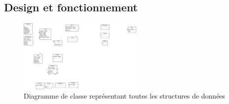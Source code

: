 \documentclass[a4paper]{article}
\begin{document}
\subsection{Design et fonctionnement}
\begin{figure}[h]
   \caption{\label{3} Diagramme de classe représentant toutes les structures de données}
   \begin{center}
   \includegraphics[height=100pt]{uml/classDiagram.eps}
   \end{center}
\end{figure}

\printindex
\tableofcontents
\listoffigures
\end{document}
